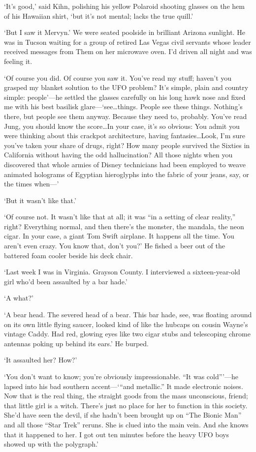 `It's good,' said Kihn, polishing his yellow Polaroid shooting glasses on the hem of his Hawaiian shirt, `but it's not mental; lacks the true quill.'

`But I saw it Mervyn.' We were seated poolside in brilliant Arizona sunlight. He was in Tucson waiting for a group of retired Las Vegas civil servants whose leader received messages from Them on her microwave oven. I'd driven all night and was feeling it.

`Of course you did. Of course you saw it. You've read my stuff; haven't you grasped my blanket solution to the UFO problem? It's simple, plain and country simple: people'—he settled the glasses carefully on his long hawk nose and fixed me with his best basilisk glare—`see…things. People see these things. Nothing's there, but people see them anyway. Because they need to, probably. You've read Jung, you should know the score…In your case, it's so obvious: You admit you were thinking about this crackpot architecture, having fantasies…Look, I'm sure you've taken your share of drugs, right? How many people survived the Sixties in California without having the odd hallucination? All those nights when you discovered that whole armies of Disney technicians had been employed to weave animated holograms of Egyptian hieroglyphs into the fabric of your jeans, say, or the times when—'

`But it wasn't like that.'

`Of course not. It wasn't like that at all; it was “in a setting of clear reality,” right? Everything normal, and then there's the monster, the mandala, the neon cigar. In your case, a giant Tom Swift airplane. It happens all the time. You aren't even crazy. You know that, don't you?' He fished a beer out of the battered foam cooler beside his deck chair.

`Last week I was in Virginia. Grayson County. I interviewed a sixteen-year-old girl who'd been assaulted by a bar hade.'

`A what?'

`A bear head. The severed head of a bear. This bar hade, see, was floating around on its own little flying saucer, looked kind of like the hubcaps on cousin Wayne's vintage Caddy. Had red, glowing eyes like two cigar stubs and telescoping chrome antennas poking up behind its ears.' He burped.

`It assaulted her? How?'

`You don't want to know; you're obviously impressionable. “It was cold”'—he lapsed into his bad southern accent—`“and metallic.” It made electronic noises. Now that is the real thing, the straight goods from the mass unconscious, friend; that little girl is a witch. There's just no place for her to function in this society. She'd have seen the devil, if she hadn't been brought up on “The Bionic Man” and all those “Star Trek” reruns. She is clued into the main vein. And she knows that it happened to her. I got out ten minutes before the heavy UFO boys showed up with the polygraph.'

